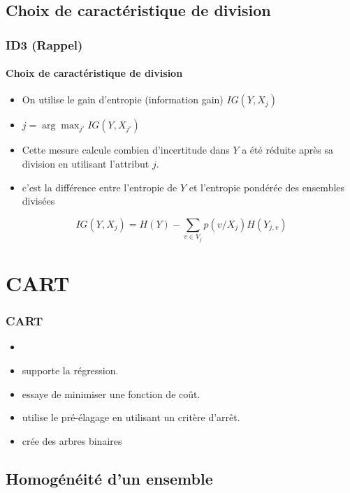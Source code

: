 \documentclass[xcolor=table]{beamer}
\begin{document}
\subsection{Choix de caractéristique de division}

\begin{frame}
	\frametitle{ID3 (Rappel)}
	\framesubtitle{Choix de caractéristique de division}
	
	\begin{itemize}
		\item On utilise le gain d'entropie (information gain) $IG(Y, X_j)$
		\item $j = \arg\max_{j'} IG(Y, X_{j'})$
		\item Cette mesure calcule combien d'incertitude dans $Y$ a été réduite après sa division en utilisant l'attribut $j$.
		\item c'est la différence entre l'entropie de $Y$ et l'entropie pondérée des ensembles divisées
	\end{itemize}

	\[IG(Y, X_j) = H(Y) - \sum_{v \in V_j} p(v/X_j) H(Y_{j, v})\]
	
	
\end{frame}

\section{CART}

\begin{frame}
	\frametitle{CART}
	
	\begin{itemize}
		\item {}
		\item supporte la régression.
		\item essaye de minimiser une fonction de coût.
		\item utilise le pré-élagage en utilisant un critère d'arrêt.
		\item crée des arbres binaires 
	\end{itemize}
	
\end{frame}

\subsection{Homogénéité d'un ensemble}
\end{document}
